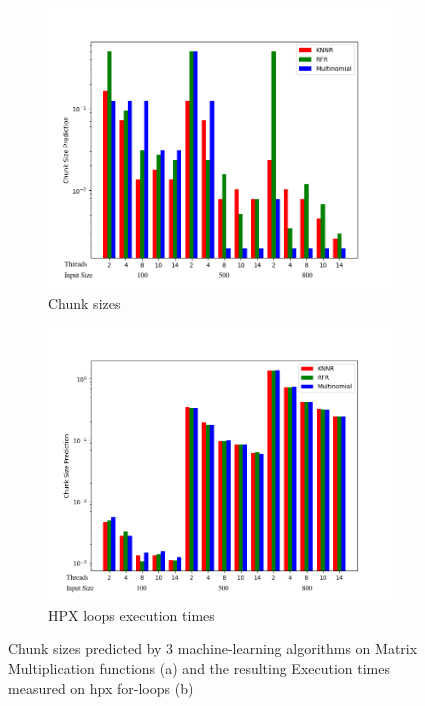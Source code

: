\begin{figure}[h]
	\centering
	\begin{subfigure}[b]{0.5\textwidth}
		\centering
		\includegraphics[width=\textwidth]{images/matrix_mult_corrected_predictions_bar.png}
		\caption[Network2]%
		{{Chunk sizes}}    
	\end{subfigure}
	\hfill
	\begin{subfigure}[b]{0.49\textwidth}  
		\centering 
		\includegraphics[width=\textwidth]{images/matrix_mult_corrected_times_bar.png}
		\caption[]%
		{{HPX loops execution times}}    
	\end{subfigure}
		\caption{Chunk sizes predicted by 3 machine-learning algorithms on Matrix Multiplication functions (a) and the resulting Execution times measured on hpx for-loops (b)} 
	
\end{figure}

